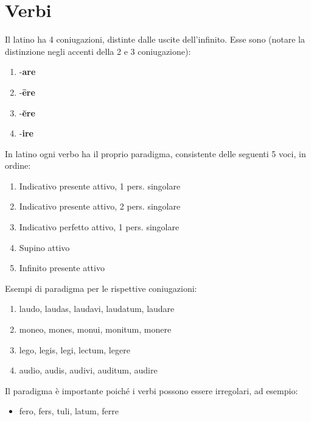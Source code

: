\chapter{Verbi}
Il latino ha 4 coniugazioni, distinte dalle uscite dell'infinito. Esse sono (notare la distinzione
negli accenti della 2 e 3 coniugazione):

\begin{enumerate}
    \item -\textbf{are}
    \item -\textbf{\={e}re}
    \item -\textbf{\u{e}re}
    \item -\textbf{ire}
\end{enumerate}

In latino ogni verbo ha il proprio paradigma, consistente delle seguenti 5 voci, in ordine:

\begin{enumerate}
    \item Indicativo presente attivo, 1 pers. singolare
    \item Indicativo presente attivo, 2 pers. singolare
    \item Indicativo perfetto attivo, 1 pers. singolare
    \item Supino attivo
    \item Infinito presente attivo
\end{enumerate}

Esempi di paradigma per le rispettive coniugazioni:
\begin{enumerate}
    \item laudo, laudas, laudavi, laudatum, laudare
    \item moneo, mones, monui, monitum, monere
    \item lego, legis, legi, lectum, legere
    \item audio, audis, audivi, auditum, audire
\end{enumerate}

Il paradigma \`e importante poich\'e i verbi possono essere irregolari, ad esempio:

\begin{itemize}
    \item fero, fers, tuli, latum, ferre
\end{itemize}

\clearpage

\clearpage

